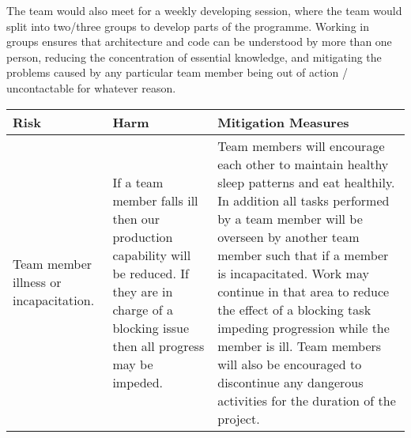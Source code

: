 The team would also meet for a weekly developing session, where the team would split into two/three groups to develop parts of the programme. Working in groups ensures that architecture and code can be understood by more than one person, reducing the concentration of essential knowledge, and mitigating the problems caused by any particular team member being out of action / uncontactable for whatever reason.

\begin{center}
\begin{landscape}
    \begin{longtable}{>{\raggedright}p{3cm}  >{\raggedright}p{7cm}  p{12cm}}
        \toprule
        \textbf{Risk} & \textbf{Harm} & \textbf{Mitigation Measures}
\\ \toprule
        Team member illness or incapacitation.           & If a team member falls ill then our production capability will be reduced. If they are in charge of a blocking issue then all progress may be impeded.                                                                                                                                                                                                                       & Team members will encourage each other to maintain healthy sleep patterns and eat healthily. In addition all tasks performed by a team member will be overseen by another team member such that if a member is incapacitated. Work may continue in that area to reduce the effect of a blocking task impeding progression while the member is ill. Team members will also be encouraged to discontinue any dangerous activities for the duration of the project.                                                                                                                                                                                                                                                                                                                                                                                                                                                                                                                                                                         \\ \midrule

\end{longtable}
\end{landscape}
\end{center}
